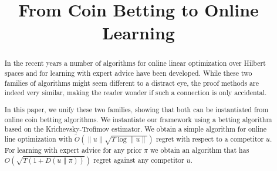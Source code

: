 \documentclass{colt2016} %
\title{From Coin Betting to Online Learning}
\newcommand{\KL}[2]{D({#1}\|{#2})}  %
\begin{document}
\maketitle

\begin{abstract}
In the recent years a number of algorithms for online linear optimization over
Hilbert spaces and for learning with expert advice have been developed. While
these two families of algorithms might seem different to a distract eye, the
proof methods are indeed very similar, making the reader wonder if such a
connection is only accidental.

In this paper, we unify these two families, showing that both can be
instantiated from online coin betting algorithms. We instantiate our framework
using a betting algorithm based on the Krichevsky-Trofimov estimator. We obtain
a simple algorithm for online line optimization with $\widetilde O(\|u\|\sqrt{T
\log\|u\|})$ regret with respect to a competitor $u$. For learning with
expert advice for any prior $\pi$ we obtain an algorithm that has $O(\sqrt{T
(1 + \KL{u}{\pi})})$ regret against any competitor $u$.
\end{abstract}









\appendix
\end{document}
